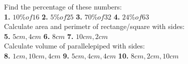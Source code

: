 \documentclass[a4paper]{article}
\begin{document}
\begin{LARGE}

Find the percentage of these numbers: \\[0.1cm]

\textbf{1.} $10 \% of 16$ \hspace{0.3cm}
\textbf{2.} $5 \% of 25$ \hspace{0.3cm}
\textbf{3.} $70 \% of 32$ \hspace{0.3cm}
\textbf{4.} $24 \% of 63$ \\[0.1cm]

Calculate area and perimetr of rectange/square with sides: \\[0.1cm]

\textbf{5.} $5 cm, 4 cm$ \hspace{0.3cm}
\textbf{6.} $8 cm$ \hspace{0.3cm}
\textbf{7.} $10cm, 2cm$ \\[0.1cm]

Calculate volume of parallelepiped with sides: \\[0.1cm]

\textbf{8.} $1 cm, 10 cm, 4 cm$ \hspace{0.3cm}
\textbf{9.} $5 cm, 4 cm, 4 cm$ \hspace{0.3cm}
\textbf{10.} $8 cm, 2 cm, 10 cm$ \hspace{0.3cm}



\end{LARGE}
\end{document}

